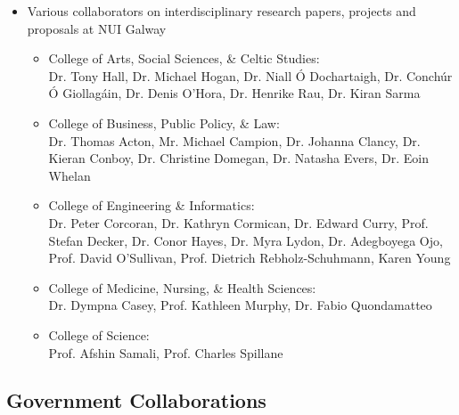 \documentclass[10pt,a4paper]{res} %
\begin{document}
\begin{resume}
\begin{itemize}
\begin{itemize}
\end{itemize}
\item Various collaborators on interdisciplinary research papers, projects and proposals at NUI Galway
\begin{itemize} \itemsep -2pt
\item College of Arts, Social Sciences, \& Celtic Studies: \\ Dr. Tony Hall, Dr. Michael Hogan, Dr. Niall \'{O} Dochartaigh, Dr. Conch\'{u}r \'{O} Giollag\'{a}in, Dr. Denis O'Hora, Dr. Henrike Rau, Dr. Kiran Sarma
\item College of Business, Public Policy, \& Law: \\ Dr. Thomas Acton, Mr. Michael Campion, Dr. Johanna Clancy, Dr. Kieran Conboy, Dr. Christine Domegan, Dr. Natasha Evers, Dr. Eoin Whelan
\item College of Engineering \& Informatics: \\ Dr. Peter Corcoran, Dr. Kathryn Cormican, Dr. Edward Curry, Prof. Stefan Decker, Dr. Conor Hayes, Dr. Myra Lydon, Dr. Adegboyega Ojo, Prof. David O'Sullivan, Prof. Dietrich Rebholz-Schuhmann, Karen Young
\item College of Medicine, Nursing, \& Health Sciences: \\ Dr. Dympna Casey, Prof. Kathleen Murphy, Dr. Fabio Quondamatteo
\item College of Science: \\ Prof. Afshin Samali, Prof. Charles Spillane
\end{itemize}
\end{itemize}

\subsection*{Government Collaborations}


\end{resume}
\end{document}
